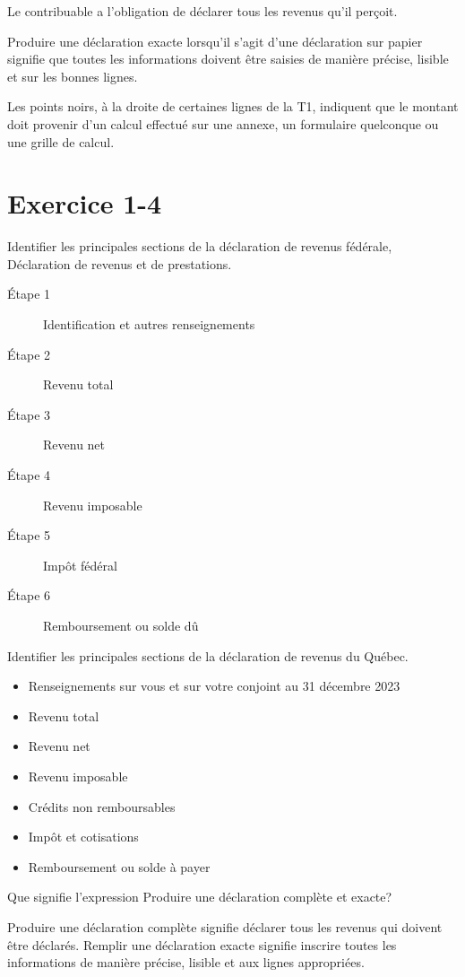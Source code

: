 Le contribuable a l'obligation de déclarer tous les revenus qu'il perçoit.

Produire une déclaration exacte lorsqu'il s'agit d'une déclaration sur papier signifie que toutes les informations doivent être saisies de manière précise, lisible et sur les bonnes lignes.

Les points noirs, à la droite de certaines lignes de la T1, indiquent que le montant doit provenir d'un calcul effectué sur une annexe, un formulaire quelconque ou une grille de calcul.



\section{Exercice 1-4}
\setcounter{question}{0}
\begin{question}
	Identifier les principales sections de la déclaration de revenus fédérale, Déclaration de revenus et de prestations.
\end{question}
\begin{description}
	\item[Étape 1] Identification et autres renseignements
	\item[Étape 2] Revenu total
	\item[Étape 3] Revenu net
	\item[Étape 4] Revenu imposable
	\item[Étape 5] Impôt fédéral
	\item[Étape 6] Remboursement ou solde dû
\end{description}

\begin{question}
	Identifier les principales sections de la déclaration de revenus du Québec.
\end{question}
\begin{itemize}
	\item Renseignements sur vous et  sur votre conjoint au 31 décembre 2023
	\item Revenu total
	\item Revenu net
	\item Revenu imposable
	\item Crédits non remboursables
	\item Impôt et cotisations
	\item Remboursement ou solde à payer
\end{itemize}

\begin{question}
	Que signifie l'expression \og Produire une déclaration complète et exacte\fg{}?
\end{question}
Produire une déclaration complète signifie déclarer tous les revenus qui doivent être déclarés. Remplir une déclaration exacte signifie inscrire toutes les informations de manière précise, lisible et aux lignes appropriées.



